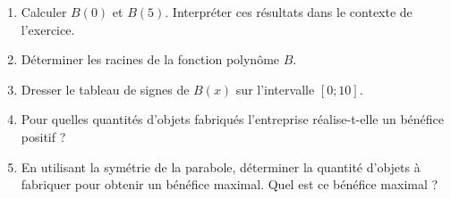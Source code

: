 \documentclass[11pt,a4paper]{book}
\begin{document}
\begin{enumerate}[label=\textbf{\arabic*)}]
	\item Calculer $B(0)$ et $B(5)$. Interpréter ces résultats dans le contexte de l'exercice.
	\item Déterminer les racines de la fonction polynôme $B$.
	\item Dresser le tableau de signes de $B(x)$ sur l'intervalle $[0 ; 10]$.
	\item Pour quelles quantités d'objets fabriqués l'entreprise réalise-t-elle un bénéfice positif ?
	\item En utilisant la symétrie de la parabole, déterminer la quantité d'objets à fabriquer pour obtenir un bénéfice maximal. Quel est ce bénéfice maximal ?
\end{enumerate}
\end{document}
